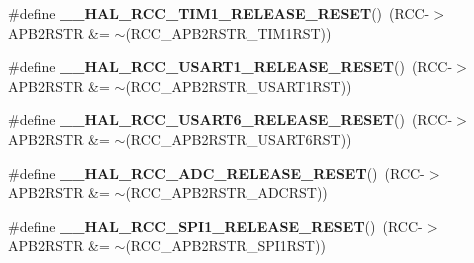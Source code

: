 \begin{DoxyCompactItemize}
\item 
\mbox{\label{group___r_c_c___a_p_b2___force___release___reset_ga1857f223177c9548ce1bae9753e0a7b4}} 
\#define {\bfseries \+\_\+\+\_\+\+H\+A\+L\+\_\+\+R\+C\+C\+\_\+\+T\+I\+M1\+\_\+\+R\+E\+L\+E\+A\+S\+E\+\_\+\+R\+E\+S\+ET}()~(R\+CC-\/$>$A\+P\+B2\+R\+S\+TR \&= $\sim$(R\+C\+C\+\_\+\+A\+P\+B2\+R\+S\+T\+R\+\_\+\+T\+I\+M1\+R\+ST))
\item 
\mbox{\label{group___r_c_c___a_p_b2___force___release___reset_ga243061674e38d05d222697046d43813a}} 
\#define {\bfseries \+\_\+\+\_\+\+H\+A\+L\+\_\+\+R\+C\+C\+\_\+\+U\+S\+A\+R\+T1\+\_\+\+R\+E\+L\+E\+A\+S\+E\+\_\+\+R\+E\+S\+ET}()~(R\+CC-\/$>$A\+P\+B2\+R\+S\+TR \&= $\sim$(R\+C\+C\+\_\+\+A\+P\+B2\+R\+S\+T\+R\+\_\+\+U\+S\+A\+R\+T1\+R\+ST))
\item 
\mbox{\label{group___r_c_c___a_p_b2___force___release___reset_ga6b60ae1fd712732bea57de27f79a20d3}} 
\#define {\bfseries \+\_\+\+\_\+\+H\+A\+L\+\_\+\+R\+C\+C\+\_\+\+U\+S\+A\+R\+T6\+\_\+\+R\+E\+L\+E\+A\+S\+E\+\_\+\+R\+E\+S\+ET}()~(R\+CC-\/$>$A\+P\+B2\+R\+S\+TR \&= $\sim$(R\+C\+C\+\_\+\+A\+P\+B2\+R\+S\+T\+R\+\_\+\+U\+S\+A\+R\+T6\+R\+ST))
\item 
\mbox{\label{group___r_c_c___a_p_b2___force___release___reset_ga06411259bd987c32186d5851815cbd59}} 
\#define {\bfseries \+\_\+\+\_\+\+H\+A\+L\+\_\+\+R\+C\+C\+\_\+\+A\+D\+C\+\_\+\+R\+E\+L\+E\+A\+S\+E\+\_\+\+R\+E\+S\+ET}()~(R\+CC-\/$>$A\+P\+B2\+R\+S\+TR \&= $\sim$(R\+C\+C\+\_\+\+A\+P\+B2\+R\+S\+T\+R\+\_\+\+A\+D\+C\+R\+ST))
\item 
\mbox{\label{group___r_c_c___a_p_b2___force___release___reset_gad7b4bc8c8a9146529a175c45eecf25e5}} 
\#define {\bfseries \+\_\+\+\_\+\+H\+A\+L\+\_\+\+R\+C\+C\+\_\+\+S\+P\+I1\+\_\+\+R\+E\+L\+E\+A\+S\+E\+\_\+\+R\+E\+S\+ET}()~(R\+CC-\/$>$A\+P\+B2\+R\+S\+TR \&= $\sim$(R\+C\+C\+\_\+\+A\+P\+B2\+R\+S\+T\+R\+\_\+\+S\+P\+I1\+R\+ST))
\item 
\mbox{\label{group___r_c_c___a_p_b2___force___release___reset_ga56de80d50f5ab276ebdeee16a0e2a31b}} 

\end{DoxyCompactItemize}
